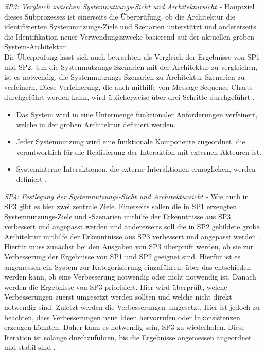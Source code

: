 \emph{SP3: Vergleich zwischen Systemnutzungs-Sicht und Architektursicht -}
Hauptziel dieses Subprozesses ist einerseits die \"Uberpr\"ufung, ob die Architektur die identifizierten Systemnutzungs-Ziele und Szenarien unterst\"utzt und andererseits die Identifikation neuer Verwendungszwecke basierend auf der aktuellen groben System-Architektur \cite{Poh01}.\\

Die \"Uberpr\"ufung l\"asst sich auch betrachten als Vergleich der Ergebnisse von SP1 und SP2. Um die Systemnutzungs-Szenarien mit der Architektur zu vergleichen, ist es notwendig, die Systemnutzungs-Szenarien zu Architektur-Szenarien zu verfeinern. Diese Verfeinerung, die auch mithilfe von Message-Sequence-Charts durchgef\"uhrt werden kann, wird \"ublicherweise \"uber drei Schritte durchgef\"uhrt \cite{Poh01}.\\

\begin{itemize}
\item Das System wird in eine Untermenge funktionaler Anforderungen verfeinert, welche in der groben Architektur definiert werden.
\item Jeder Systemnutzung wird eine funktionale Komponente zugeordnet, die verantwortlich f\"ur die Realisierung der Interaktion mit externen Akteuren ist. 
\item Systeminterne Interaktionen, die externe Interaktionen erm\"oglichen, werden definiert \cite{Poh01}.\\
\end{itemize}

\emph{SP4: Festlegung der Systemnutzungs-Sicht und Architektursicht -}
Wie auch in SP3 gibt es hier zwei zentrale Ziele. Einerseits sollen die in SP1 erzeugten Systemnutzungs-Ziele und -Szenarien mithilfe der Erkenntnisse aus SP3 verbessert und angepasst werden und andererseits soll die in SP2 gebildete grobe Architektur mithilfe der Erkenntnisse aus SP3 verbessert und angepasst werden \cite{Poh01}.\\

Hierf\"ur muss zun\"achst bei den Ausgaben von SP3 \"uberpr\"uft werden, ob sie zur Verbesserung der Ergebnisse von SP1 und SP2 geeignet sind. Hierf\"ur ist es angemessen ein System zur Kategorisierung einzuf\"uhren, \"uber das entschieden werden kann, ob eine Verbesserung notwendig oder nicht notwendig ist. Danach werden die Ergebnisse von SP3 priorisiert. Hier wird \"uberpr\"uft, welche Verbesserungen zuerst umgesetzt werden sollten und welche nicht direkt notwendig sind. Zuletzt werden die Verbesserungen umgesetzt. Hier ist jedoch zu beachten, dass Verbesserungen neue Ideen hervorrufen oder Inkonsistenzen erzeugen k\"onnten. Daher kann es notwendig sein, SP3 zu wiederholen. Diese Iteration ist solange durchzuf\"uhren, bis die Ergebnisse angemessen angeordnet und stabil sind \cite{Poh01}.\\

